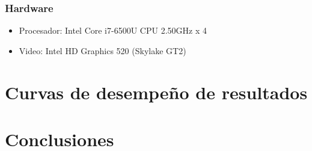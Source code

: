 \documentclass[12pt,letterpaper]{scrartcl}
\begin{document}
\subsubsection{Hardware}
\begin{itemize}
\item Procesador: Intel Core i7-6500U CPU  2.50GHz x 4
\item Video: Intel HD Graphics 520 (Skylake GT2)
\end{itemize}
\newpage



\section{Curvas de desempeño de resultados}


\newpage
\section{Conclusiones}
\end{document}

